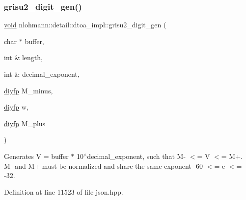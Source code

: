 \subsubsection{\texorpdfstring{grisu2\_digit\_gen()}{grisu2\_digit\_gen()}}
{\footnotesize\ttfamily \mbox{\hyperlink{namespacenlohmann_1_1detail_a59fca69799f6b9e366710cb9043aa77d}{void}} nlohmann\+::detail\+::dtoa\+\_\+impl\+::grisu2\+\_\+digit\+\_\+gen (\begin{DoxyParamCaption}\item[{char $\ast$}]{buffer,  }\item[{int \&}]{length,  }\item[{int \&}]{decimal\+\_\+exponent,  }\item[{\mbox{\hyperlink{structnlohmann_1_1detail_1_1dtoa__impl_1_1diyfp}{diyfp}}}]{M\+\_\+minus,  }\item[{\mbox{\hyperlink{structnlohmann_1_1detail_1_1dtoa__impl_1_1diyfp}{diyfp}}}]{w,  }\item[{\mbox{\hyperlink{structnlohmann_1_1detail_1_1dtoa__impl_1_1diyfp}{diyfp}}}]{M\+\_\+plus }\end{DoxyParamCaption})\hspace{0.3cm}{\ttfamily [inline]}}

Generates V = buffer $\ast$ 10$^\wedge$decimal\+\_\+exponent, such that M-\/ $<$= V $<$= M+. M-\/ and M+ must be normalized and share the same exponent -\/60 $<$= e $<$= -\/32. 

Definition at line 11523 of file json.\+hpp.


